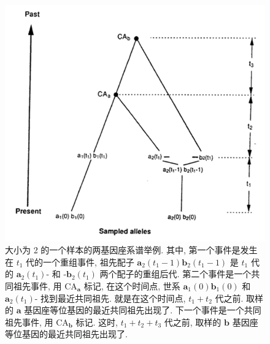 \documentclass[
    12pt,%
    ]{article}
\begin{document}
\begin{figure}
    \centering
    \includegraphics{coalescent-process.images/image3.png}
    \caption{大小为 2 的一个样本的两基因座系谱举例. 其中, 第一个事件是发生在 $t_{1}$ 代的一个重组事件, 祖先配子
        $\mathbf{a}_{2}(t_{1}-1)\mathbf{b}_{2}(t_{1}-1)$ 是 $t_{1}$ 代的 $\mathbf{a}_{2}(t_{1})\text{-}$ 和
        $\text{-}\mathbf{b}_{2}(t_{1})$ 两个配子的重组后代. 第二个事件是一个共同祖先事件, 用 $\text{CA}_{\mathbf{a}}$
        标记, 在这个时间点, 世系 $\mathbf{a}_{1}(0)\mathbf{b}_{1}(0)$ 和 $\mathbf{a}_{2}(t_{1})\text{-}$
        找到最近共同祖先. 就是在这个时间点, $t_{1}+t_{2}$ 代之前. 取样的 $\mathbf{a}$ 基因座等位基因的最近共同祖先出现了.
        下一个事件是一个共同祖先事件, 用 $\text{CA}_{\mathbf{b}}$ 标记. 这时, $t_{1}+t_{2}+t_{3}$ 代之前, 取样的
        $\mathbf{b}$ 基因座等位基因的最近共同祖先出现了.}
    \label{fig:3}
\end{figure}
\end{document}
